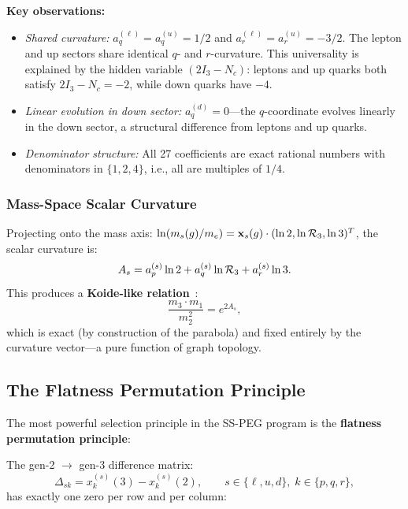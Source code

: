\textbf{Key observations:}
\begin{itemize}
\item \textit{Shared curvature:} $a_q^{(\ell)} = a_q^{(u)} = 1/2$ and $a_r^{(\ell)} = a_r^{(u)} = -3/2$. The lepton and up sectors share identical $q$- and $r$-curvature. This universality is explained by the hidden variable $(2I_3 - N_c)$: leptons and up quarks both satisfy $2I_3 - N_c = -2$, while down quarks have $-4$.
\item \textit{Linear evolution in down sector:} $a_q^{(d)} = 0$---the $q$-coordinate evolves linearly in the down sector, a structural difference from leptons and up quarks.
\item \textit{Denominator structure:} All 27 coefficients are exact rational numbers with denominators in $\{1, 2, 4\}$, i.e., all are multiples of $1/4$.
\end{itemize}

\subsubsection{Mass-Space Scalar Curvature}

Projecting onto the mass axis: $\ln(m_s(g)/m_e) = \mathbf{x}_s(g) \cdot (\ln 2, \ln\mathcal{R}_3, \ln 3)^T$, the scalar curvature is:
\begin{equation}
A_s = a_p^{(s)} \ln 2 + a_q^{(s)} \ln\mathcal{R}_3 + a_r^{(s)} \ln 3.
\end{equation}
This produces a \textbf{Koide-like relation}~\cite{koide1981}:
\begin{equation}
\frac{m_3 \cdot m_1}{m_2^2} = e^{2A_s},
\end{equation}
which is exact (by construction of the parabola) and fixed entirely by the curvature vector---a pure function of graph topology.

\subsection{The Flatness Permutation Principle}\label{sec:flatness}

The most powerful selection principle in the SS-PEG program is the \textbf{flatness permutation principle}:

\begin{theorem}\label{thm:flatness}
The gen-2 $\to$ gen-3 difference matrix:
\begin{equation}
\Delta_{sk} = x_k^{(s)}(3) - x_k^{(s)}(2), \qquad s \in \{\ell, u, d\},\; k \in \{p, q, r\},
\end{equation}
has exactly one zero per row and per column:
\end{theorem}


